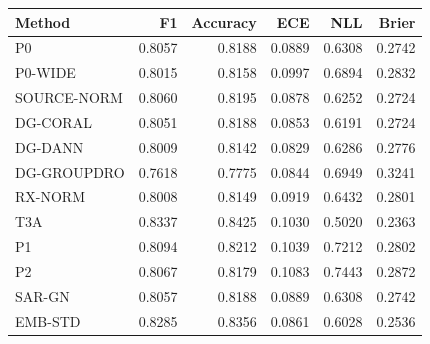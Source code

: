 \begin{tabular}{lrrrrr}
\toprule
Method & F1 & Accuracy & ECE & NLL & Brier \\
\midrule
P0 & 0.8057 & 0.8188 & 0.0889 & 0.6308 & 0.2742 \\
P0-WIDE & 0.8015 & 0.8158 & 0.0997 & 0.6894 & 0.2832 \\
SOURCE-NORM & 0.8060 & 0.8195 & 0.0878 & 0.6252 & 0.2724 \\
DG-CORAL & 0.8051 & 0.8188 & 0.0853 & 0.6191 & 0.2724 \\
DG-DANN & 0.8009 & 0.8142 & 0.0829 & 0.6286 & 0.2776 \\
DG-GROUPDRO & 0.7618 & 0.7775 & 0.0844 & 0.6949 & 0.3241 \\
RX-NORM & 0.8008 & 0.8149 & 0.0919 & 0.6432 & 0.2801 \\
T3A & 0.8337 & 0.8425 & 0.1030 & 0.5020 & 0.2363 \\
P1 & 0.8094 & 0.8212 & 0.1039 & 0.7212 & 0.2802 \\
P2 & 0.8067 & 0.8179 & 0.1083 & 0.7443 & 0.2872 \\
SAR-GN & 0.8057 & 0.8188 & 0.0889 & 0.6308 & 0.2742 \\
EMB-STD & 0.8285 & 0.8356 & 0.0861 & 0.6028 & 0.2536 \\
\bottomrule\end{tabular}
